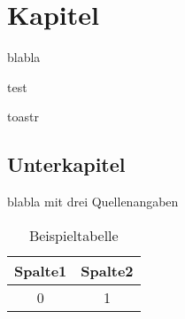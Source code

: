 \section{Kapitel}

blabla

test

toastr


\subsection{Unterkapitel}

blabla mit drei Quellenangaben\cite{ietf-ipfix-protocol,snoeren2001hash,belenky2003ip}

\begin{figure}[h]%
 	\begin{center}%
 	\end{center}%
\end{figure}

\begin{table}[h]%
 	\begin{center}%
		\caption{Beispieltabelle}\label{tab:example}%
	 	\begin{tabular}{c|c}%
 			Spalte1 & Spalte2\\
 			\hline
 			0 & 1\\
 		\end{tabular}%
 	\end{center}%
\end{table}

